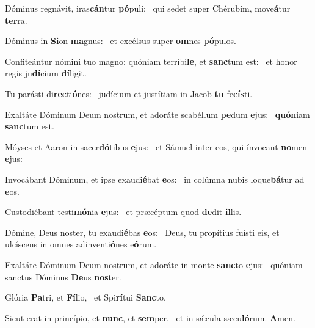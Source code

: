 \item Dóminus regnávit, iras\textbf{cán}tur \textbf{pó}puli:~\psstar{} qui sedet super Chérubim, move\textbf{á}tur \textbf{ter}ra.
\item Dóminus in \textbf{Si}on \textbf{ma}gnus:~\psstar{} et excélsus super \textbf{om}nes \textbf{pó}pulos.
\item Confiteántur nómini tuo magno: quóniam terríbi\textbf{le}, et \textbf{sanc}tum est:~\psstar{} et honor regis ju\textbf{dí}cium \textbf{dí}ligit.
\item Tu parásti di\textbf{rec}ti\textbf{ó}nes:~\psstar{} judícium et justítiam in Jacob \textbf{tu} fe\textbf{cís}ti.
\item Exaltáte Dóminum Deum nostrum, et adoráte scabéllum \textbf{pe}dum \textbf{e}jus:~\psstar{} \textbf{quón}iam \textbf{sanc}tum est.
\item Móyses et Aaron in sacer\textbf{dó}tibus \textbf{e}jus:~\psstar{} et Sámuel inter eos, qui ínvocant \textbf{no}men \textbf{e}jus:
\item Invocábant Dóminum, et ipse exaudi\textbf{é}bat \textbf{e}os:~\psstar{} in colúmna nubis loque\textbf{bá}tur ad \textbf{e}os.
\item Custodiébant testi\textbf{mó}nia \textbf{e}jus:~\psstar{} et præcéptum quod \textbf{de}dit \textbf{il}lis.
\item Dómine, Deus noster, tu exaudi\textbf{é}bas \textbf{e}os:~\psstar{} Deus, tu propítius fuísti eis, et ulcíscens in omnes adinventi\textbf{ó}nes e\textbf{ó}rum.
\item Exaltáte Dóminum Deum nostrum, et adoráte in monte \textbf{sanc}to \textbf{e}jus:~\psstar{} quóniam sanctus Dóminus \textbf{De}us \textbf{nos}ter.
\item Glória \textbf{Pa}tri, et \textbf{Fí}lio,~\psstar{} et Spi\textbf{rí}tui \textbf{Sanc}to.
\item Sicut erat in princípio, et \textbf{nunc}, et \textbf{sem}per,~\psstar{} et in sǽcula sæcu\textbf{ló}rum. \textbf{A}men.
